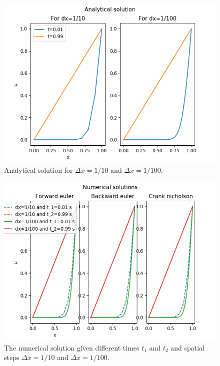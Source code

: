 \documentclass{article}
\begin{document}
\begin{figure}[H]
	\centering
	\includegraphics[width=140mm]{b.png}
	\caption{Analytical solution for $\Delta x = 1/10$ and $\Delta x =1/100$.}
	\label{fig:b}
\end{figure}

\begin{figure}[H]
	\centering
	\includegraphics[width=140mm]{c.png}
	\caption{The numerical solution given different times $t_1$ and $t_2$ and spatial steps $\Delta x =1/10$ and $\Delta x = 1/100$.}
	\label{fig:c}
\end{figure}
\end{document}
